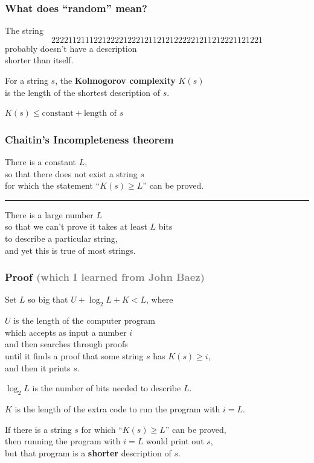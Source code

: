 \documentclass[14pt,aspectratio=169]{beamer}
\begin{document}
\begin{frame}
  \frametitle{What does ``random'' mean?}

  The string
  \[22221121112212222122212112121222221211212221121221\]
  \pause probably doesn't have a description \\
  \quad shorter than itself.

  \pause\vfill

  For a string $s$, the \textbf{Kolmogorov complexity} $K(s)$ \\
  \quad is the length of the shortest description of $s$.

  \pause\vfill

  $K(s) \leq \mbox{constant} + \mbox{length of $s$}$

\end{frame}

\begin{frame}
  \frametitle{Chaitin's Incompleteness theorem}
  
  There is a constant $L$, \\
  \quad so that there does not exist a string $s$ \\
  \quad for which the statement ``$K(s) \geq L$'' can be proved.
  
  \pause\vfill\hrule\vfill

  There is a large number $L$ \\
  \quad so that we can't prove it takes at least $L$ bits \\
  \quad to describe a particular string, \\
  and yet this is true of most strings.

\end{frame}

\begin{frame}
  \frametitle{Proof \textcolor{gray}{(which I learned from John Baez)}}

  Set $L$ so big that $U + \log_2 L + K < L$, where

  $U$ is the length of the computer program \\
  \quad which accepts as input a number $i$ \\
  \quad and then searches through proofs \\
  \quad until it finds a proof that some string $s$ has $K(s) \geq i$, \\
  \quad\quad and then it prints $s$.

  $\log_2 L$ is the number of bits needed to describe $L$.

  $K$ is the length of the extra code to run the program with $i = L$.

  \pause\vfill

  If there is a string $s$ for which ``$K(s) \geq L$'' can be proved, \\
  \quad then running the program with $i = L$ would print out $s$, \\
  \pause\quad but that program is a \textbf{shorter} description of $s$.

\end{frame}
\end{document}
